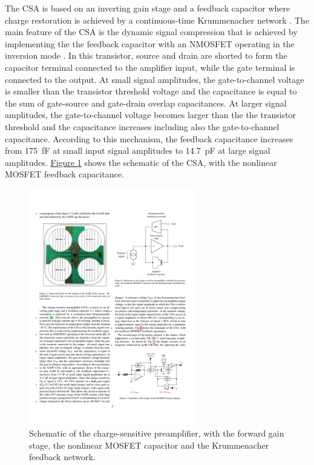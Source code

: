 \par
The CSA is based on an inverting gain stage and a feedback capacitor where charge restoration is achieved by a continuous-time Krummenacher network \cite{krummenacher_1991_pixel}. The main feature of the CSA is the dynamic signal compression that is achieved by implementing the the feedback capacitor with an NMOSFET operating in the inversion mode \cite{manghisoni_2018_dynamic}. In this transistor, source and drain are shorted to form the capacitor terminal connected to the amplifier input, while the gate terminal is connected to the output. At small signal amplitudes, the gate-to-channel voltage is smaller than the transistor threshold voltage and the capacitance is equal to the sum of gate-source and gate-drain overlap capacitances. At larger signal amplitudes, the gate-to-channel voltage becomes larger than the the transistor threshold and the capacitance increases including also the gate-to-channel capacitance. According to this mechanism, the feedback capacitance increases from \SI{175}{\femto\farad} at small input signal amplitudes to \SI{14.7}{\pico\farad} at large signal amplitudes. \hyperref[figCSAschematic]{Figure \ref{figCSAschematic}} shows the schematic of the CSA, with the nonlinear MOSFET feedback capacitance.

\begin{figure}[h!]
    \centering
    \includegraphics[width=0.65\textwidth]{Images/chap1/CSA_schematic.pdf}
    \caption{Schematic of the charge-sensitive preamplifier, with the forward gain stage, the nonlinear MOSFET capacitor and the Krummenacher feedback network.}
    \label{figCSAschematic}
\end{figure}

